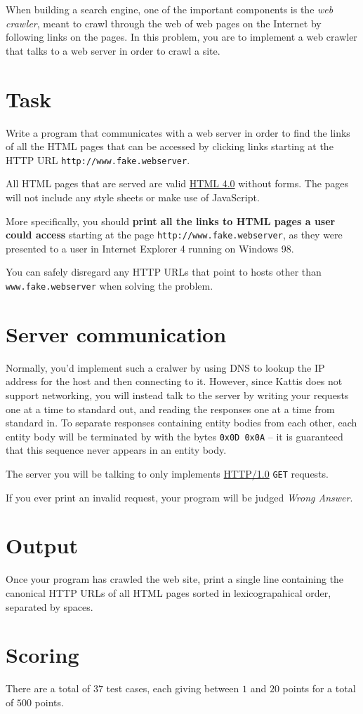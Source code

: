 When building a search engine, one of the important components is the \emph{web crawler}, meant to crawl through the web of web pages on the Internet by following links on the pages.
In this problem, you are to implement a web crawler that talks to a web server in order to crawl a site.

\section*{Task}
Write a program that communicates with a web server in order to find the links of all the HTML pages that can be accessed by clicking links starting at the HTTP URL \texttt{http://www.fake.webserver}.

All HTML pages that are served are valid \href{https://www.w3.org/TR/1998/REC-html40-19980424/}{HTML 4.0} without forms.
The pages will not include any style sheets or make use of JavaScript.

More specifically, you should \textbf{print all the links to HTML pages a user could access} starting at the page \texttt{http://www.fake.webserver}, as they were presented to a user in Internet Explorer 4 running on Windows 98.

You can safely disregard any HTTP URLs that point to hosts other than \texttt{www.fake.webserver} when solving the problem.

\section*{Server communication}
Normally, you'd implement such a cralwer by using DNS to lookup the IP address for the host and then connecting to it.
However, since Kattis does not support networking, you will instead talk to the server by writing your requests one at a time to standard out, and reading the responses one at a time from standard in. To separate responses containing entity bodies from each other, each entity body will be terminated by with the bytes \texttt{0x0D 0x0A} -- it is guaranteed that this sequence never appears in an entity body.

The server you will be talking to only implements \href{https://www.w3.org/Protocols/HTTP/1.0/spec.html}{HTTP/1.0} \texttt{GET} requests.

If you ever print an invalid request, your program will be judged \emph{Wrong Answer}.

\section*{Output}
Once your program has crawled the web site, print a single line containing the canonical HTTP URLs of all HTML pages sorted in lexicograpahical order, separated by spaces.

\section*{Scoring}
There are a total of $37$ test cases, each giving between $1$ and $20$ points for a total of $500$ points.
